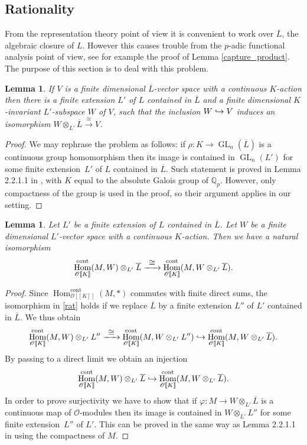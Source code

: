 \documentclass[JEP,XML,SOM,Unicode,NoEqCountersInSection]{cedram}
\let\mathcal\mathscr
\newcommand{\To}[1]{\mathchoice{\xrightarrow{\textstyle\kern4pt#1\kern3pt}}{\stackrel{#1}{\longrightarrow}}{}{}}
\newcommand\hto{\mathrel{\lhook\joinrel\to}}
\newtheorem{lem}[prop]{Lemma}
\theoremstyle{definition}
\DeclareMathOperator{\Hom}{Hom}
\DeclareMathOperator{\GL}{GL}
\newcommand{\br}[1]{[\![#1]\!]}
\newcommand{\Qp}{\mathbb {Q}_p}
\newcommand{\cO}{\mathcal{O}}
\newcommand{\cont}{\mathrm{cont}}
\newcommand{\Lbar}{\overline{L}}
\begin{document}
\subsection{Rationality} From the representation theory point of view it is convenient to work over $\Lbar$, the algebraic closure of $L$. However this causes trouble from the $p$\nobreakdash-adic functional analysis point of view, see for example the proof
of Lemma \ref{capture_product}. The purpose of this section is to deal with this problem.

\begin{lem}\label{finite_structure} If $V$ is a finite dimensional $\Lbar$-vector space with a continuous $K$\nobreakdash-action then there
is a finite extension $L'$ of $L$ contained in $\Lbar$ and a finite dimensional $K$\nobreakdash-in\-variant $L'$-subspace $W$ of $V$,
such that the inclusion $W\hto V$ induces an isomorphism $W\otimes_{L'} \Lbar\overset{\cong}{\longrightarrow} V$.
\end{lem}

\begin{proof} We may rephrase the problem as follows: if $\rho: K \to \GL_n(\Lbar)$ is a continuous group
homomorphism then its image is contained in $\GL_n(L')$ for some finite extension~$L'$ of $L$ contained in $\Lbar$.
Such statement is proved in Lemma 2.2.1.1 in \cite{bm1}, with $K$ equal to the absolute Galois group of $\Qp$. However,
only compactness of the group is used in the proof, so their argument applies in our setting.
\end{proof}

\begin{lem}\label{homs_the_same} Let $L'$ be a finite extension of $L$ contained in $\Lbar$. Let $W$ be a finite dimensional $L'$-vector
space with a continuous $K$-action. Then we have a natural isomorphism
\begin{equation}\label{rat}
\Hom_{\cO\br{K}}^{\cont}(M, W)\otimes_{L'} \Lbar \To{\cong}\Hom_{\cO\br{K}}^{\cont}(M, W\otimes_{L'}\Lbar).
\end{equation}
\end{lem}

\begin{proof} Since $\Hom_{\cO\br{K}}^{\cont}(M, \ast)$ commutes with finite direct sums, the isomorphism in \eqref{rat} holds if we replace $\Lbar$ by a finite extension $L''$ of $L'$ contained in $\Lbar$. We thus obtain
\[
\Hom_{\cO\br{K}}^{\cont}(M, W)\otimes_{L'} L'' \To{\cong}\Hom_{\cO\br{K}}^{\cont}(M, W\otimes_{L'} L'')
\hto \Hom_{\cO\br{K}}^{\cont}(M, W\otimes_{L'} \Lbar).
\]
By passing to a direct limit we obtain an injection
\[
\Hom_{\cO\br{K}}^{\cont}(M, W)\otimes_{L'} \Lbar \hto \Hom_{\cO\br{K}}^{\cont}(M, W\otimes_{L'} \Lbar).
\]
In order to prove surjectivity we have to show that if $\varphi: M\to W\otimes_{L'}\Lbar$ is a continuous map of
$\cO$-modules then its image is contained in $W\otimes_{L'}L''$ for some finite extension~$L''$ of $L'$. This can be proved in the same way as Lemma 2.2.1.1 in \cite{bm1}
using the compactness of $M$.
\end{proof}
\end{document}
